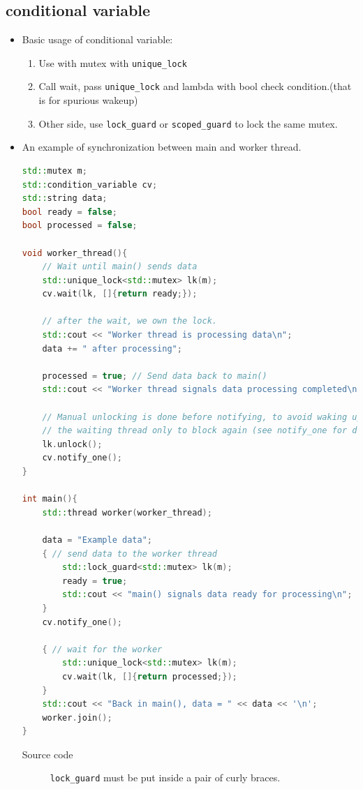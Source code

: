 \documentclass[a4paper,11pt,twoside]{book}
\begin{document}
\subsection{conditional variable}
\begin{itemize}
	\item Basic usage of conditional variable:
\begin{enumerate}
	\item Use with mutex with \texttt{unique\_lock} 
	\item Call wait, pass \texttt{unique\_lock} and lambda with bool check condition.(that is for spurious wakeup)
	\item Other side, use \texttt{lock\_guard} or \texttt{scoped\_guard} to lock the same mutex.
\end{enumerate}

\item An example of synchronization between main and worker thread.
\begin{lstlisting}[frame=single, language=c++]
std::mutex m;
std::condition_variable cv;
std::string data;
bool ready = false;
bool processed = false;

void worker_thread(){
	// Wait until main() sends data
	std::unique_lock<std::mutex> lk(m);
	cv.wait(lk, []{return ready;});
	
	// after the wait, we own the lock.
	std::cout << "Worker thread is processing data\n";
	data += " after processing";
	
	processed = true; // Send data back to main()
	std::cout << "Worker thread signals data processing completed\n";
	
	// Manual unlocking is done before notifying, to avoid waking up
	// the waiting thread only to block again (see notify_one for details)
	lk.unlock();
	cv.notify_one();
}

int main(){
	std::thread worker(worker_thread);
	
	data = "Example data";
	{ // send data to the worker thread
		std::lock_guard<std::mutex> lk(m);
		ready = true;
		std::cout << "main() signals data ready for processing\n";
	}
	cv.notify_one();
	
	{ // wait for the worker
		std::unique_lock<std::mutex> lk(m);
		cv.wait(lk, []{return processed;});
	}
	std::cout << "Back in main(), data = " << data << '\n';
	worker.join();
}
\end{lstlisting}
\begin{description}
		\item[Source code] \texttt{lock\_guard} must be put inside a pair of curly braces. 
\end{description}



\end{itemize}
\end{document}

